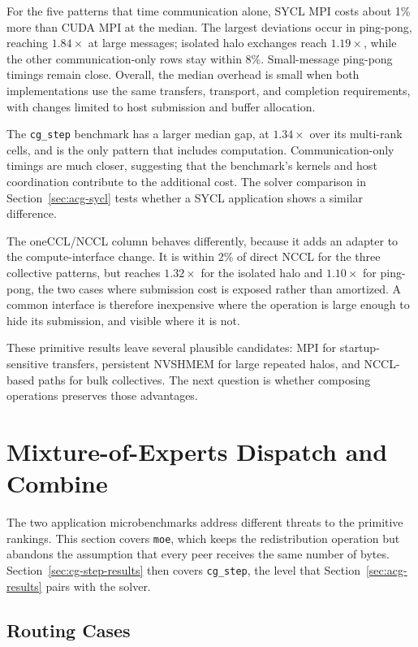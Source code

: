 For the five patterns that time communication alone, SYCL MPI costs about 1\% more than CUDA MPI at the median. The largest deviations occur in ping-pong, reaching $1.84\times$ at large messages; isolated halo exchanges reach $1.19\times$, while the other communication-only rows stay within 8\%. Small-message ping-pong timings remain close. Overall, the median overhead is small when both implementations use the same transfers, transport, and completion requirements, with changes limited to host submission and buffer allocation.

The \texttt{cg\_step} benchmark has a larger median gap, at $1.34\times$ over its multi-rank cells, and is the only pattern that includes computation. Communication-only timings are much closer, suggesting that the benchmark's kernels and host coordination contribute to the additional cost. The solver comparison in Section~\ref{sec:acg-sycl} tests whether a SYCL application shows a similar difference.

The oneCCL/NCCL column behaves differently, because it adds an adapter to the compute-interface change. It is within 2\% of direct NCCL for the three collective patterns, but reaches $1.32\times$ for the isolated halo and $1.10\times$ for ping-pong, the two cases where submission cost is exposed rather than amortized. A common interface is therefore inexpensive where the operation is large enough to hide its submission, and visible where it is not.

These primitive results leave several plausible candidates: MPI for startup-sensitive transfers, persistent NVSHMEM for large repeated halos, and NCCL-based paths for bulk collectives. The next question is whether composing operations preserves those advantages.

\section{Mixture-of-Experts Dispatch and Combine}\label{sec:moe-results}

The two application microbenchmarks address different threats to the primitive rankings. This section covers \texttt{moe}, which keeps the redistribution operation but abandons the assumption that every peer receives the same number of bytes. Section~\ref{sec:cg-step-results} then covers \texttt{cg\_step}, the level that Section~\ref{sec:acg-results} pairs with the solver.

\subsection{Routing Cases}

